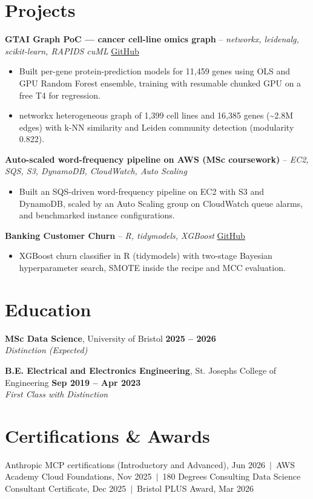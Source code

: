 \documentclass[a4paper,11pt]{article}
\begin{document}
\section{Projects}
\noindent\textbf{GTAI Graph PoC — cancer cell-line omics graph} -- \textit{networkx, leidenalg, scikit-learn, RAPIDS cuML} \hfill \href{https://github.com/Thiruvel-AP/GTAI-GraphPOC}{GitHub}
\begin{itemize}
  \item Built per-gene protein-prediction models for 11,459 genes using OLS and GPU Random Forest ensemble, training with resumable chunked GPU on a free T4 for regression.
  \item networkx heterogeneous graph of 1,399 cell lines and 16,385 genes (\textasciitilde{}2.8M edges) with k-NN similarity and Leiden community detection (modularity 0.822).
\end{itemize}
\vspace{3pt}
\noindent\textbf{Auto-scaled word-frequency pipeline on AWS (MSc coursework)} -- \textit{EC2, SQS, S3, DynamoDB, CloudWatch, Auto Scaling} \hfill 
\begin{itemize}
  \item Built an SQS-driven word-frequency pipeline on EC2 with S3 and DynamoDB, scaled by an Auto Scaling group on CloudWatch queue alarms, and benchmarked instance configurations.
\end{itemize}
\vspace{3pt}
\noindent\textbf{Banking Customer Churn} -- \textit{R, tidymodels, XGBoost} \hfill \href{https://github.com/Thiruvel-AP/Banking-Customer-Churn-Prediction}{GitHub}
\begin{itemize}
  \item XGBoost churn classifier in R (tidymodels) with two-stage Bayesian hyperparameter search, SMOTE inside the recipe and MCC evaluation.
\end{itemize}

\section{Education}
\textbf{MSc Data Science}, University of Bristol \hfill \textbf{2025 – 2026}\\ \textit{Distinction (Expected)}\par
\vspace{3pt}
\textbf{B.E. Electrical and Electronics Engineering}, St. Joseph\textquotesingle{}s College of Engineering \hfill \textbf{Sep 2019 – Apr 2023}\\ \textit{First Class with Distinction}\par

\section{Certifications \& Awards}
Anthropic MCP certifications (Introductory and Advanced), Jun 2026 \,$|$\, AWS Academy Cloud Foundations, Nov 2025 \,$|$\, 180 Degrees Consulting Data Science Consultant Certificate, Dec 2025 \,$|$\, Bristol PLUS Award, Mar 2026
\end{document}
